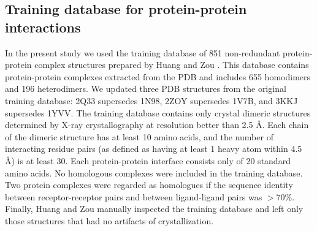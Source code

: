 \subsection{Training database for protein-protein interactions}
\label{trainingSet}
In the present study we used the training database of 851 non-redundant protein-protein complex structures  prepared by Huang and Zou \cite{Huang2008}. 
This database contains  protein-protein complexes extracted from the PDB \cite{Berman2000} and includes 655 homodimers and 196 heterodimers. 
We updated three PDB structures from the original training database: 2Q33 supersedes 1N98, 2ZOY supersedes 1V7B, and 3KKJ supersedes 1YVV. 
The training database  contains only crystal dimeric structures determined by X-ray crystallography at resolution better than 2.5 \AA. 
Each chain of the dimeric structure has at least 10 amino acids, and the number of interacting residue pairs (as defined as having at least 1 heavy atom within 4.5 \AA) is at least 30. 
Each protein-protein interface consists only of 20 standard amino acids. 
No homologous complexes were included in the training database. 
Two protein complexes were regarded as homologues if the sequence identity between receptor-receptor pairs and between ligand-ligand pairs was $>70\%$. 
Finally, Huang and Zou \cite{Huang2008} manually inspected the training database and left only those structures that had no artifacts of crystallization. 

